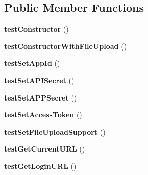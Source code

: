 \subsection*{Public Member Functions}
\begin{DoxyCompactItemize}
\item 
\hypertarget{class_p_h_p_s_d_k_test_case_a47094dc941e72950570900d1418f89c6}{{\bfseries test\-Constructor} ()}\label{class_p_h_p_s_d_k_test_case_a47094dc941e72950570900d1418f89c6}

\item 
\hypertarget{class_p_h_p_s_d_k_test_case_a8b6b6fd4f7ab2c3e855fdeb2f3310ff4}{{\bfseries test\-Constructor\-With\-File\-Upload} ()}\label{class_p_h_p_s_d_k_test_case_a8b6b6fd4f7ab2c3e855fdeb2f3310ff4}

\item 
\hypertarget{class_p_h_p_s_d_k_test_case_a513d6388343ddc551d8131efb3882287}{{\bfseries test\-Set\-App\-Id} ()}\label{class_p_h_p_s_d_k_test_case_a513d6388343ddc551d8131efb3882287}

\item 
\hypertarget{class_p_h_p_s_d_k_test_case_aa49e5a1b6edc0a88df079589ad3e6da7}{{\bfseries test\-Set\-A\-P\-I\-Secret} ()}\label{class_p_h_p_s_d_k_test_case_aa49e5a1b6edc0a88df079589ad3e6da7}

\item 
\hypertarget{class_p_h_p_s_d_k_test_case_a7d43c82400c7c3610280403bba6e1c1c}{{\bfseries test\-Set\-A\-P\-P\-Secret} ()}\label{class_p_h_p_s_d_k_test_case_a7d43c82400c7c3610280403bba6e1c1c}

\item 
\hypertarget{class_p_h_p_s_d_k_test_case_adc9f02bdeff4c9926e48d20860fe316a}{{\bfseries test\-Set\-Access\-Token} ()}\label{class_p_h_p_s_d_k_test_case_adc9f02bdeff4c9926e48d20860fe316a}

\item 
\hypertarget{class_p_h_p_s_d_k_test_case_aaefb484e1878e3a401f4519329392cbd}{{\bfseries test\-Set\-File\-Upload\-Support} ()}\label{class_p_h_p_s_d_k_test_case_aaefb484e1878e3a401f4519329392cbd}

\item 
\hypertarget{class_p_h_p_s_d_k_test_case_ae005253c168493445558f0961d89e918}{{\bfseries test\-Get\-Current\-U\-R\-L} ()}\label{class_p_h_p_s_d_k_test_case_ae005253c168493445558f0961d89e918}

\item 
\hypertarget{class_p_h_p_s_d_k_test_case_a2c57258cdd2450a12b5e95e59e5fca08}{{\bfseries test\-Get\-Login\-U\-R\-L} ()}\label{class_p_h_p_s_d_k_test_case_a2c57258cdd2450a12b5e95e59e5fca08}


\end{DoxyCompactItemize}
